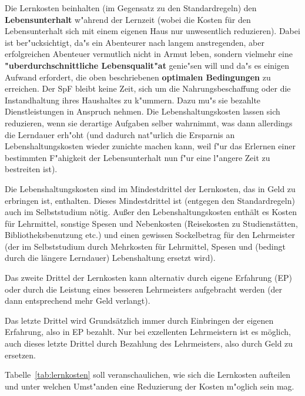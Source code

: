 \documentclass[10pt,a4paper,germanpar]{article}
\begin{document}
Die Lernkosten beinhalten (im Gegensatz zu den Standardregeln) den
\textbf{Lebensunterhalt} w"ahrend der Lernzeit (wobei die Kosten für den
Lebensunterhalt sich mit einem eigenen Haus nur unwesentlich reduzieren).
Dabei ist ber"ucksichtigt, da"s ein Abenteurer nach langem anstregenden, aber
erfolgreichen Abenteuer vermutlich nicht in Armut leben, sondern vielmehr eine
\textbf{"uberdurchschnittliche Lebensqualit"at} genie"sen will und da"s es
einigen Aufwand erfordert, die oben beschriebenen \textbf{optimalen
  Bedingungen} zu erreichen. Der SpF bleibt keine Zeit, sich um die
Nahrungsbeschaffung oder die Instandhaltung ihres Haushaltes zu k"ummern.
Dazu mu"s sie bezahlte Dienstleistungen in Anspruch nehmen. Die
Lebenshaltungskosten lassen sich reduzieren, wenn sie derartige Aufgaben selber
wahrnimmt, was dann allerdings die Lerndauer erh"oht (und dadurch nat"urlich
die Ersparnis an Lebenshaltungskosten wieder zunichte machen kann, weil f"ur
das Erlernen einer bestimmten F"ahigkeit der Lebensunterhalt nun f"ur eine
l"angere Zeit zu bestreiten ist).

Die Lebenshaltungskosten sind im Mindestdrittel der Lernkosten, das in
Geld zu erbringen ist, enthalten. Dieses Mindestdrittel ist (entgegen
den Standardregeln) auch im Selbststudium nötig. Außer den
Lebenshaltungskosten enthält es Kosten für Lehrmittel, sonstige Spesen
und Nebenkosten (Reisekosten zu Studienstätten, Bibliotheksbenutzung
etc.) und einen gewissen Sockelbetrag für den Lehrmeister (der im
Selbststudium durch Mehrkosten für Lehrmittel, Spesen und (bedingt durch
die längere Lerndauer) Lebenshaltung ersetzt wird).

Das zweite Drittel der Lernkosten kann alternativ durch eigene
Erfahrung (EP) oder durch die Leistung eines besseren Lehrmeisters
aufgebracht werden (der dann entsprechend mehr Geld verlangt).

Das letzte Drittel wird Grundsätzlich immer durch Einbringen der
eigenen Erfahrung, also in EP bezahlt. Nur bei exzellenten
Lehrmeistern ist es möglich, auch dieses letzte Drittel durch
Bezahlung des Lehrmeisters, also durch Geld zu ersetzen.

Tabelle~\ref{tab:lernkosten} soll veranschaulichen, wie sich die Lernkosten
aufteilen und unter welchen Umst"anden eine Reduzierung der Kosten
m"oglich sein mag.
\end{document}
